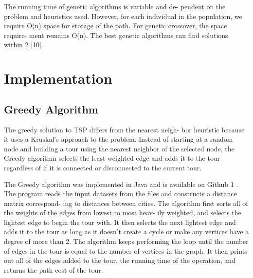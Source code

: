 \documentclass[10pt,twocolumn,letterpaper]{article}
\begin{document}
The running time of genetic algorithms is variable and de-
pendent on the problem and heuristics used. However, for
each individual in the population, we require O(n) space for
storage of the path. For genetic crossover, the space require-
ment remains O(n). The best genetic algorithms can find
solutions within 2%
[10].

\section{Implementation}
\subsection{Greedy Algorithm}
The greedy solution to TSP differs from the nearest neigh-
bor heuristic because it uses a Kruskal’s approach to the
problem. Instead of starting at a random node and building
a tour using the nearest neighbor of the selected node, the
Greedy algorithm selects the least weighted edge and adds
it to the tour regardless of if it is connected or disconnected
to the current tour.

The Greedy algorithm was implemented in Java and is
available on Github 1 . The program reads the input datasets
from the files and constructs a distance matrix correspond-
ing to distances between cities. The algorithm first sorts
all of the weights of the edges from lowest to most heav-
ily weighted, and selects the lightest edge to begin the tour
with. It then selects the next lightest edge and adds it to
the tour as long as it doesn’t create a cycle or make any
vertices have a degree of more than 2. The algorithm keeps
performing the loop until the number of edges in the tour is
equal to the number of vertices in the graph. It then prints
out all of the edges added to the tour, the running time of
the operation, and returns the path cost of the tour.

{\small


}
\end{document}
